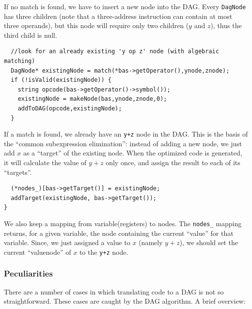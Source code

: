 \documentclass[a4paper]{article}
\begin{document}
If no match is found, we have to insert a new node into the DAG. Every
\texttt{DagNode} has three children (note that a three-address instruction can
contain at most three operands), but this node will require only two children
($y$ and $z$), thus the third child is null.

\begin{verbatim}
  //look for an already existing 'y op z' node (with algebraic matching)
  DagNode* existingNode = match(*bas->getOperator(),ynode,znode);
  if (!isValid(existingNode)) {
    string opcode(bas->getOperator()->symbol());
    existingNode = makeNode(bas,ynode,znode,0);
    addToDAG(opcode,existingNode);
  }
\end{verbatim}

If a match is found, we already have an \texttt{y+z} node in the DAG. This is
the basis of the ``common subexpression elimination'': instead of adding a new
node, we just add $x$ as a ``target'' of the existing node. When the optimized
code is generated, it will calculate the value of $y+z$ only once, and assign
the result to each of its ``targets''. 

\begin{verbatim}
  (*nodes_)[bas->getTarget()] = existingNode;
  addTarget(existingNode, bas->getTarget());
}
\end{verbatim}

We also keep a mapping from variable(registers) to nodes. The \texttt{nodes\_}
mapping returns, for a given variable, the node containing the current
``value'' for that variable. Since, we just assigned a value to $x$ (namely
$y+z$), we should set the current ``valuenode'' of $x$ to the \texttt{y+z}
node.

\subsubsection{Peculiarities}

There are a number of cases in which translating code to a DAG is not so
straightforward. These cases are caught by the DAG algorithm. A brief
overview:
\end{document}
